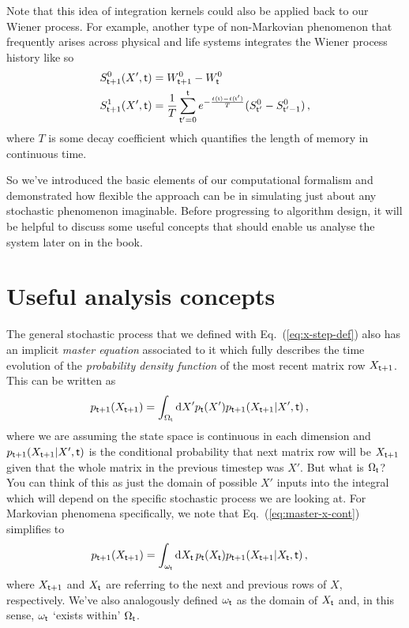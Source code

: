 \documentclass{book}
\begin{document}
Note that this idea of integration kernels could also be applied back to our Wiener process. For example, another type of non-Markovian phenomenon that frequently arises across physical and life systems integrates the Wiener process history like so
\begin{align}
S^{0}_{{\sf t}+1}(X',{\sf t}) &= W^0_{{\sf t}+1}-W^0_{\sf t}\\
S^{1}_{{\sf t}+1}(X',{\sf t}) &= \frac{1}{T}\sum^{{\sf t}}_{{\sf t}'=0}e^{-\frac{t({\sf t})-t({\sf t}')}{T}} (S^{0}_{{\sf t}'}-S^{0}_{{\sf t}'-1}) \,,
\end{align}
where $T$ is some decay coefficient which quantifies the length of memory in continuous time.

So we've introduced the basic elements of our computational formalism and demonstrated how flexible the approach can be in simulating just about any stochastic phenomenon imaginable. Before progressing to algorithm design, it will be helpful to discuss some useful concepts that should enable us analyse the system later on in the book.

\section{\sffamily Useful analysis concepts}

The general stochastic process that we defined with Eq.~(\ref{eq:x-step-def}) also has an implicit \emph{master equation} associated to it which fully describes the time evolution of the \emph{probability density function} of the most recent matrix row $X_{{\sf t}+1}$. This can be written as
\begin{align}
p_{{\sf t}+1}(X_{{\sf t}+1}) &= \int_{\Omega_{\sf t}}{\rm d}X' p_{\sf t}(X') p_{{\sf t}+1}(X_{{\sf t}+1}\vert X',{\sf t}) \label{eq:master-x-cont} \,,
\end{align}
where we are assuming the state space is continuous in each dimension and $p_{{\sf t}+1}(X_{{\sf t}+1}\vert X',{\sf t})$ is the conditional probability that next matrix row will be $X_{{\sf t}+1}$ given that the whole matrix in the previous timestep was $X'$. But what is $\Omega_{\sf t}$? You can think of this as just the domain of possible $X'$ inputs into the integral which will depend on the specific stochastic process we are looking at. For Markovian phenomena specifically, we note that Eq.~(\ref{eq:master-x-cont}) simplifies to
\begin{align}
p_{{\sf t}+1}(X_{{\sf t}+1}) &= \int_{\omega_{\sf t}}{\rm d}X_{{\sf t}} \,p_{\sf t}(X_{{\sf t}}) p_{{\sf t}+1}(X_{{\sf t}+1}\vert X_{{\sf t}},{\sf t}) \label{eq:master-x-cont-markov} \,,
\end{align}
where $X_{{\sf t}+1}$ and $X_{\sf t}$ are referring to the next and previous rows of $X$, respectively. We've also analogously defined $\omega_{{\sf t}}$ as the domain of $X_{{\sf t}}$ and, in this sense, $\omega_{{\sf t}}$ `exists within' $\Omega_{\sf t}$.
\end{document}
